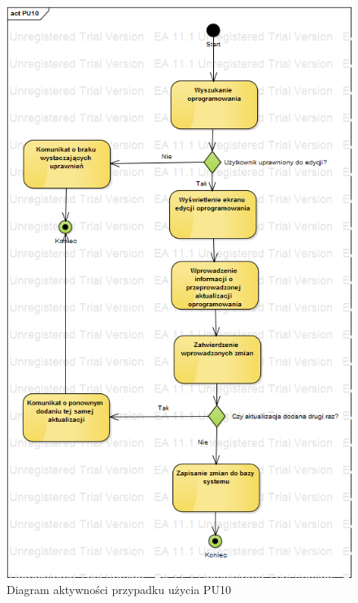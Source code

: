 \begin{figure}[h!]
	\centering
	\includegraphics[scale=0.6]{img/diagrams/activityDiagrams/PU10.png}
	\caption{Diagram aktywności przypadku użycia PU10 \label{fig:labelADPU10}}
\end{figure}


